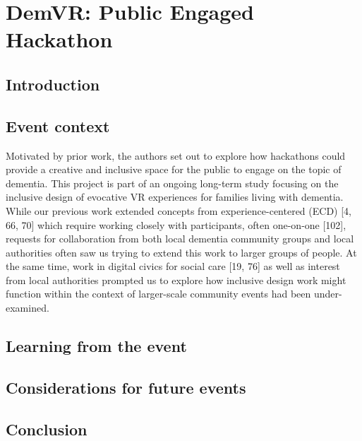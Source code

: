\chapter{DemVR: Public Engaged Hackathon}
\label{DemVR: Public Engaged Hackathon}

\section{Introduction}
\label{sec:DemVRIntroduction}


\section{Event context}
\label{sec:ContextEvent}

Motivated by prior work, the authors set out to explore how hackathons could provide a creative and inclusive space for the public to engage on the topic of dementia. This project is part of an ongoing long-term study focusing on the inclusive design of evocative VR experiences for families living with dementia. While our previous work extended concepts from experience-centered (ECD) [4, 66, 70] which require working closely with participants, often one-on-one [102], requests for collaboration from both local dementia community groups and local authorities often saw us trying to extend this work to larger groups of people. At the same time, work in digital civics for social care [19, 76] as well as interest from local authorities prompted us to explore how inclusive design work might function within the context of larger-scale community events had been under-examined. 

\subsection{}

\section{Learning from the event}
\label{sec:LearningEvent}

\section{Considerations for future events}
\label{sec:ConsdierationsEvent}

\section{Conclusion}
\label{sec:Conclusion}